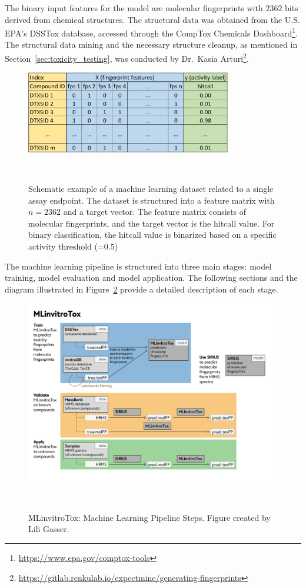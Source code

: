 The binary input features for the model are molecular fingerprints with $2362$ bits derived from chemical structures. The structural data was obtained from the U.S. EPA's DSSTox database, accessed through the CompTox Chemicals Dashboard\footnote{\url{https://www.epa.gov/comptox-tools}}. The structural data mining and the necessary structure cleanup, as mentioned in Section~\ref{sec:toxicity_testing}, was conducted by Dr.\ Kasia Arturi\footnote{\url{https://gitlab.renkulab.io/expectmine/generating-fingerprints}}.

\begin{figure} 
    \centering
    \includegraphics[width=0.8\textwidth]{figures/ml_dataset.png}
    \caption{Schematic example of a machine learning dataset related to a single assay endpoint. The dataset is structured into a feature matrix with $n=2362$ and a target vector. The feature matrix consists of molecular fingerprints, and the target vector is the hitcall value. For binary classification, the hitcall value is binarized based on a specific activity threshold (=0.5)}
~\label{fig:ml_dataset}
\end{figure}


The machine learning pipeline is structured into three main stages: model training, model evaluation and model application. The following sections and the diagram illustrated in Figure~\ref{fig:Project_overview} provide a detailed description of each stage.

\begin{figure}
    \centering
    \includegraphics[width=1.0\textwidth]{figures/Project_overview.png}
    \caption{MLinvitroTox: Machine Learning Pipeline Steps. Figure created by Lili Gasser.}
~\label{fig:Project_overview}
\end{figure}

